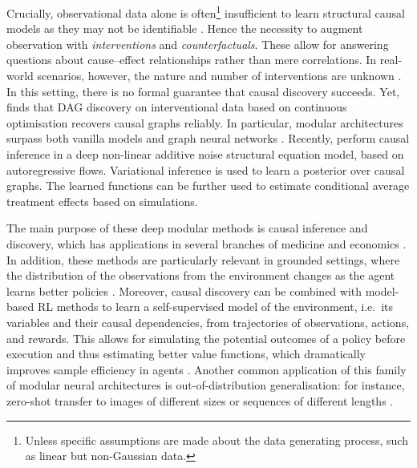 \documentclass[10pt]{article} %
\begin{document}
Crucially, observational data alone is often\footnote{Unless specific assumptions are made about the data generating process, such as linear but non-Gaussian data.} insufficient to learn structural causal models as they may not be identifiable \citep{pearl2009causality}. Hence the necessity to augment observation with \textit{interventions} and \textit{counterfactuals}. These allow for answering questions about cause--effect relationships rather than mere correlations. In real-world scenarios, however, the nature and number of interventions are unknown \citet{ke2021systematic}. In this setting, there is no formal guarantee that causal discovery succeeds. Yet, \citet{ke2019learning} finds that DAG discovery on interventional data based on continuous optimisation recovers causal graphs reliably. In particular, modular architectures surpass both vanilla models and graph neural networks \citep{ke2021systematic}. Recently, \citet{geffner2022deep} perform causal inference in a deep non-linear additive noise structural equation model, based on autoregressive flows. Variational inference is used to learn a posterior over causal graphs. The learned functions can be further used to estimate conditional average treatment effects based on simulations.

The main purpose of these deep modular methods is causal inference and discovery, which has applications in several branches of medicine and economics \citep{geffner2022deep}. In addition, these methods are particularly relevant in grounded settings, where the distribution of the observations from the environment changes as the agent learns better policies \citep{goyal2019recurrent}. Moreover, causal discovery can be combined with model-based RL methods to learn a self-supervised model of the environment, i.e.\ its variables and their causal dependencies, from trajectories of observations, actions, and rewards. This allows for simulating the potential outcomes of a policy before execution and thus estimating better value functions, which dramatically improves sample efficiency in agents \citep{ke2021systematic}. Another common application of this family of modular neural architectures is out-of-distribution generalisation: for instance, zero-shot transfer to images of different sizes or sequences of different lengths \citep{goyal2019recurrent}.

 

\iffalse
\end{document}
